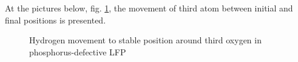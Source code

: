 At the pictures below, fig. \ref{O3Finitialfinal}, the movement of third atom between initial and final positions is presented.

\begin{figure}[h]
\begin{minipage}[h]{0.5\linewidth}
\end{minipage}
\hfill
\begin{minipage}[h]{0.5\linewidth}
\end{minipage}
\caption{Hydrogen movement to stable position around third oxygen in phosphorus-defective LFP}
\label{O3Finitialfinal}
\end{figure}

